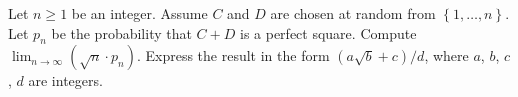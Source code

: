 \begin{problem}
    Let \( n\geq 1 \) be an integer. Assume \( C \) and \( D \) are chosen at random from \( \left\{1,\ldots,n\right\} \). Let \( p_n \) be the probability that \( C + D \) is a perfect square. Compute \( \lim_{n \to \infty}\left(\sqrt{n} \cdot p_n\right) \). Express the result in the form \( \left(a\sqrt{b} + c\right)/d \), where \( a \), \( b \), \( c \), \( d \) are integers.
\end{problem}
